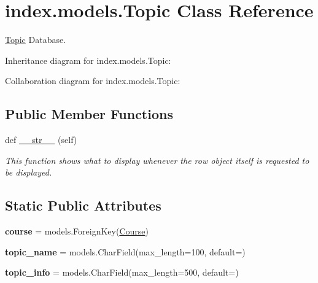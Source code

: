 \hypertarget{classindex_1_1models_1_1Topic}{}\section{index.\+models.\+Topic Class Reference}
\label{classindex_1_1models_1_1Topic}


\hyperlink{classindex_1_1models_1_1Topic}{Topic} Database.  




Inheritance diagram for index.\+models.\+Topic\+:


Collaboration diagram for index.\+models.\+Topic\+:
\subsection*{Public Member Functions}
\begin{DoxyCompactItemize}
\item 
def \hyperlink{classindex_1_1models_1_1Topic_ad2cb1f53cfc3ca252ca47fb915758549}{\+\_\+\+\_\+str\+\_\+\+\_\+} (self)
\begin{DoxyCompactList}\small\item\em This function shows what to display whenever the row object itself is requested to be displayed. \end{DoxyCompactList}\end{DoxyCompactItemize}
\subsection*{Static Public Attributes}
\begin{DoxyCompactItemize}
\item 
\mbox{\label{classindex_1_1models_1_1Topic_af02fba6ad239aea8ff26e86f5c136fb4}} 
{\bfseries course} = models.\+Foreign\+Key(\hyperlink{classindex_1_1models_1_1Course}{Course})
\item 
\mbox{\label{classindex_1_1models_1_1Topic_a7745ee006c6fff6bae4ac94674ce11c9}} 
{\bfseries topic\+\_\+name} = models.\+Char\+Field(max\+\_\+length=100, default=\textquotesingle{}\textquotesingle{})
\item 
\mbox{\label{classindex_1_1models_1_1Topic_af2f11026bedbb729ba1833692899851e}} 
{\bfseries topic\+\_\+info} = models.\+Char\+Field(max\+\_\+length=500, default=\textquotesingle{}\textquotesingle{})
\end{DoxyCompactItemize}


